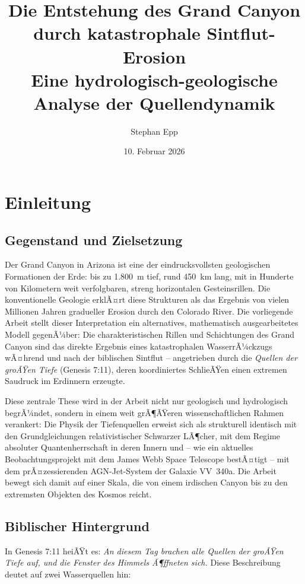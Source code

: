 ﻿\documentclass[12pt,a4paper]{report}
\title{\textbf{Die Entstehung des Grand Canyon\\ durch katastrophale Sintflut-Erosion} \\{\Large Eine hydrologisch-geologische Analyse der Quellendynamik}}
\author{Stephan Epp}
\date{10. Februar 2026}
\begin{document}
	
\maketitle
\tableofcontents
\newpage

\chapter{Einleitung}

\section{Gegenstand und Zielsetzung}

Der Grand Canyon in Arizona ist eine der eindrucksvollsten geologischen Formationen der Erde: bis zu 1.800~m tief, rund 450~km lang, mit in Hunderte von Kilometern weit verfolgbaren, streng horizontalen Gesteinsrillen. Die konventionelle Geologie erklÃ¤rt diese Strukturen als das Ergebnis von vielen Millionen Jahren gradueller Erosion durch den Colorado River. Die vorliegende Arbeit stellt dieser Interpretation ein alternatives, mathematisch ausgearbeitetes Modell gegenÃ¼ber: Die charakteristischen Rillen und Schichtungen des Grand Canyon sind das direkte Ergebnis eines katastrophalen WasserrÃ¼ckzugs wÃ¤hrend und nach der biblischen Sintflut -- angetrieben durch die \textit{Quellen der groÃŸen Tiefe} (Genesis 7:11), deren koordiniertes SchlieÃŸen einen extremen Saudruck im Erdinnern erzeugte.

Diese zentrale These wird in der Arbeit nicht nur geologisch und hydrologisch begrÃ¼ndet, sondern in einem weit grÃ¶ÃŸeren wissenschaftlichen Rahmen verankert: Die Physik der Tiefenquellen erweist sich als strukturell identisch mit den Grundgleichungen relativistischer Schwarzer LÃ¶cher, mit dem Regime absoluter Quantenherrschaft in deren Innern und -- wie ein aktuelles Beobachtungsprojekt mit dem James Webb Space Telescope bestÃ¤tigt -- mit dem prÃ¤zessierenden AGN-Jet-System der Galaxie VV~340a. Die Arbeit bewegt sich damit auf einer Skala, die von einem irdischen Canyon bis zu den extremsten Objekten des Kosmos reicht.

\section{Biblischer Hintergrund}

In Genesis 7:11 heiÃŸt es: \textit{An diesem Tag brachen alle Quellen der groÃŸen Tiefe auf, und die Fenster des Himmels Ã¶ffneten sich.} Diese Beschreibung deutet auf zwei Wasserquellen hin:
\end{document}
